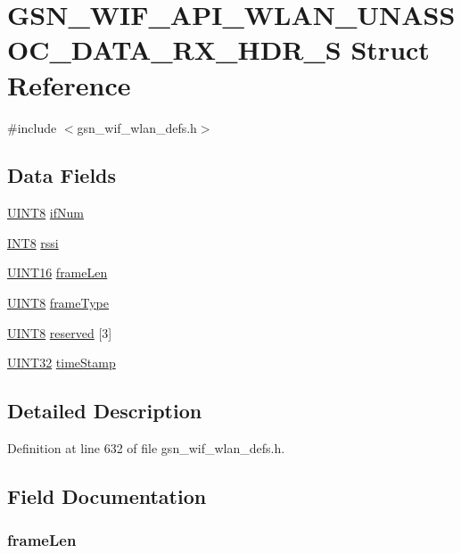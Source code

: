 \hypertarget{a00308}{
\section{GSN\_\-WIF\_\-API\_\-WLAN\_\-UNASSOC\_\-DATA\_\-RX\_\-HDR\_\-S Struct Reference}
\label{a00308}
}


{\ttfamily \#include $<$gsn\_\-wif\_\-wlan\_\-defs.h$>$}

\subsection*{Data Fields}
\begin{DoxyCompactItemize}
\item 
\hyperlink{a00660_gab27e9918b538ce9d8ca692479b375b6a}{UINT8} \hyperlink{a00308_ab3cdb6a603a565bb856885befe66676e}{ifNum}
\item 
\hyperlink{a00660_ga307b8734c020247f6bac4fcde0dcfbb9}{INT8} \hyperlink{a00308_a1655ee4c98e91aaf1c7714c22f3a2fcd}{rssi}
\item 
\hyperlink{a00660_ga09f1a1fb2293e33483cc8d44aefb1eb1}{UINT16} \hyperlink{a00308_ad7d37183f86bdd7a3c11db21c3301b32}{frameLen}
\item 
\hyperlink{a00660_gab27e9918b538ce9d8ca692479b375b6a}{UINT8} \hyperlink{a00308_aa94997d83b2de77c11b392c55081d2a9}{frameType}
\item 
\hyperlink{a00660_gab27e9918b538ce9d8ca692479b375b6a}{UINT8} \hyperlink{a00308_a2ad8f97598e206d3237401837cb9f18d}{reserved} \mbox{[}3\mbox{]}
\item 
\hyperlink{a00660_gae1e6edbbc26d6fbc71a90190d0266018}{UINT32} \hyperlink{a00308_ae7eca8d649117ff5c69fbfcfa178898f}{timeStamp}
\end{DoxyCompactItemize}


\subsection{Detailed Description}


Definition at line 632 of file gsn\_\-wif\_\-wlan\_\-defs.h.



\subsection{Field Documentation}
\hypertarget{a00308_ad7d37183f86bdd7a3c11db21c3301b32}{
\subsubsection[{frameLen}]{ {\bf frameLen}}}
\label{a00308_ad7d37183f86bdd7a3c11db21c3301b32}


